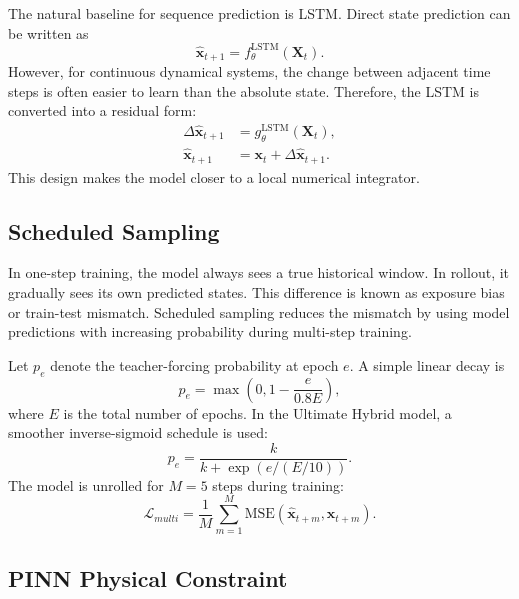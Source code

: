\documentclass[a4paper,12pt]{article}
\newcommand{\xvec}{\mathbf{x}}
\newcommand{\mse}{\mathrm{MSE}}
\begin{document}
The natural baseline for sequence prediction is LSTM. Direct state prediction can be written as
\begin{equation}
\hat{\xvec}_{t+1}=f_{\theta}^{\mathrm{LSTM}}(\mathbf{X}_t).
\end{equation}
However, for continuous dynamical systems, the change between adjacent time steps is often easier to learn than the absolute state. Therefore, the LSTM is converted into a residual form:
\begin{align}
\Delta \hat{\xvec}_{t+1} &= g_{\theta}^{\mathrm{LSTM}}(\mathbf{X}_t),\\
\hat{\xvec}_{t+1} &= \xvec_t+\Delta \hat{\xvec}_{t+1}.
\end{align}
This design makes the model closer to a local numerical integrator.

\subsection{Scheduled Sampling}

In one-step training, the model always sees a true historical window. In rollout, it gradually sees its own predicted states. This difference is known as exposure bias or train-test mismatch. Scheduled sampling reduces the mismatch by using model predictions with increasing probability during multi-step training.

Let $p_e$ denote the teacher-forcing probability at epoch $e$. A simple linear decay is
\begin{equation}
p_e=\max\left(0,1-\frac{e}{0.8E}\right),
\end{equation}
where $E$ is the total number of epochs. In the Ultimate Hybrid model, a smoother inverse-sigmoid schedule is used:
\begin{equation}
p_e=\frac{k}{k+\exp(e/(E/10))}.
\end{equation}
The model is unrolled for $M=5$ steps during training:
\begin{equation}
\mathcal{L}_{multi}=\frac{1}{M}\sum_{m=1}^{M}\mse(\hat{\xvec}_{t+m},\xvec_{t+m}).
\end{equation}

\subsection{PINN Physical Constraint}
\end{document}
